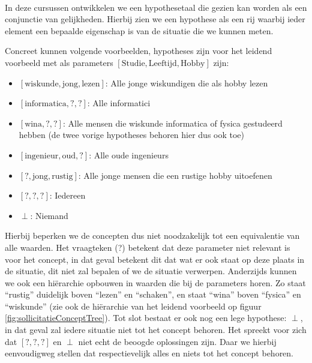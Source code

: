 \paragraph{}
In deze cursussen ontwikkelen we een hypothesetaal die gezien kan worden als een conjunctie van gelijkheden. Hierbij zien we een hypothese als een rij waarbij ieder element een bepaalde eigenschap is van de situatie die we kunnen meten.
\begin{leftbar}
Concreet kunnen volgende voorbeelden, hypotheses zijn voor het leidend voorbeeld met als parameters $\left[\mbox{Studie}, \mbox{Leeftijd}, \mbox{Hobby}\right]$ zijn:
\begin{itemize}
 \item $\left[\mbox{wiskunde},\mbox{jong},\mbox{lezen}\right]$: Alle jonge wiskundigen die als hobby lezen
 \item $\left[\mbox{informatica},\mbox{?},\mbox{?}\right]$: Alle informatici
 \item $\left[\mbox{wina},\mbox{?},\mbox{?}\right]$: Alle mensen die wiskunde informatica of fysica gestudeerd hebben (de twee vorige hypotheses behoren hier dus ook toe)
 \item $\left[\mbox{ingenieur},\mbox{oud},\mbox{?}\right]$: Alle oude ingenieurs
 \item $\left[\mbox{?},\mbox{jong},\mbox{rustig}\right]$: Alle jonge mensen die een rustige hobby uitoefenen
 \item $\left[\mbox{?},\mbox{?},\mbox{?}\right]$: Iedereen
 \item $\perp$: Niemand
\end{itemize}
\end{leftbar}
Hierbij beperken we de concepten dus niet noodzakelijk tot een equivalentie van alle waarden. Het vraagteken (?) betekent dat deze parameter niet relevant is voor het concept, in dat geval betekent dit dat wat er ook staat op deze plaats in de situatie, dit niet zal bepalen of we de situatie verwerpen. Anderzijds kunnen we ook een hi\"erarchie opbouwen in waarden die bij de parameters horen. Zo staat ``rustig'' duidelijk boven ``lezen'' en ``schaken'', en staat ``wina'' boven ``fysica'' en ``wiskunde'' (zie ook de hi\"erarchie van het leidend voorbeeld op figuur \ref{fig:sollicitatieConceptTree}). Tot slot bestaat er ook nog een lege hypothese: $\perp$, in dat geval zal iedere situatie niet tot het concept behoren. Het spreekt voor zich dat $\left[\mbox{?},\mbox{?},\mbox{?}\right]$ en $\perp$ niet echt de beoogde oplossingen zijn. Daar we hierbij eenvoudigweg stellen dat respectievelijk alles en niets tot het concept behoren.
